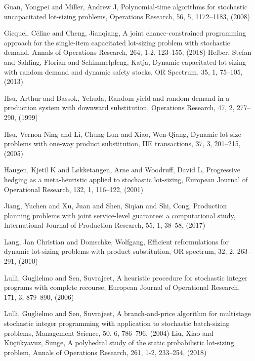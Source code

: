\documentclass[10pt]{article}
\begin{document}
\begin{thebibliography}{99}
  Guan, Yongpei and Miller, Andrew J, Polynomial-time algorithms for stochastic uncapacitated lot-sizing problems,  Operations Research, 56, 5, 1172--1183,
(2008)


Gicquel, C{\'e}line and Cheng, Jianqiang, A joint chance-constrained programming approach for the single-item capacitated lot-sizing problem with stochastic demand, Annals of Operations Research, 264, 1-2, 123--155, (2018)
 Helber, Stefan and Sahling, Florian and Schimmelpfeng, Katja, Dynamic capacitated lot sizing with random demand and dynamic safety stocks, OR Spectrum, 35, 1, 75--105, (2013)
 

Hsu, Arthur and Bassok, Yehuda, Random yield and random demand in a production system with downward substitution, Operations Research, 47, 2, 277--290,
  (1999)
  
Hsu, Vernon Ning and Li, Chung-Lun and Xiao, Wen-Qiang, Dynamic lot size problems with one-way product substitution, IIE transactions, 37, 3, 201--215, (2005)

Haugen, Kjetil K and L{\o}kketangen, Arne and Woodruff, David L, Progressive hedging as a meta-heuristic applied to stochastic lot-sizing, European Journal of Operational Research, 132, 1, 116--122, (2001)


 
 Jiang, Yuchen and Xu, Juan and Shen, Siqian and Shi, Cong, Production planning problems with joint service-level guarantee: a computational study, International Journal of Production Research, 55, 1, 38--58,
 (2017)
 
 Lang, Jan Christian and Domschke, Wolfgang, Efficient reformulations for dynamic lot-sizing problems with product substitution, OR spectrum,
32, 2, 263--291, (2010)

 Lulli, Guglielmo and Sen, Suvrajeet, A heuristic procedure for stochastic integer programs with complete recourse, European Journal of Operational Research,
171, 3, 879--890, (2006)

Lulli, Guglielmo and Sen, Suvrajeet, A branch-and-price algorithm for multistage stochastic integer programming with application to stochastic batch-sizing problems, Management Science, 50, 6, 786--796, (2004)
Liu, Xiao and K{\"u}{\c{c}}{\"u}kyavuz, Simge, A polyhedral study of the static probabilistic lot-sizing problem, Annals of Operations Research, 261, 1-2,
233--254, (2018)


\end{thebibliography}
\end{document}
